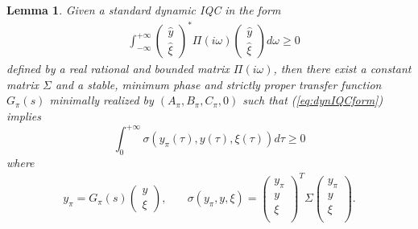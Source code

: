 \documentclass[letterpaper,10pt,conference,twocolumn]{IEEEtran}
\newtheorem{lem}[thm]{Lemma}
\newcommand{\csi}{\xi}
\newcommand{\w}{\omega}
\begin{document}
\begin{lem}\label{lem:from dynamic 2 static IQC}
	Given a standard dynamic IQC in the form
	\begin{align}\label{eq:dynIQCform}
		& \int_{-\infty}^{+\infty}
			\left(\begin{array}{c}
				\hat y\\
				\hat \csi
			\end{array}\right)^*
			\Pi(i\w)
			\left(\begin{array}{c}
				\hat y\\
				\hat \csi
			\end{array}\right)
		d\w \geq 0
	\end{align}
	defined by a real rational and bounded matrix $\Pi(i\w)$, then there exist a constant matrix $\Sigma$ and a stable, minimum phase and strictly proper transfer function $G_{\pi}(s)$ minimally realized by $(A_{\pi}, B_{\pi}, C_{\pi}, 0)$ such that (\ref{eq:dynIQCform}) implies
	\begin{equation*}
		\int_{0}^{+\infty}\sigma(y_{\pi}(\tau),y(\tau),\csi(\tau))d\tau \geq 0
	\end{equation*}
	where
	\begin{align*}
		y_{\pi}=G_{\pi}(s)\left(\begin{array}{c}
					y\\ \csi
				\end{array}\right),
		&\quad \sigma(y_{\pi},y,\csi)=
		\left(\begin{array}{c}
			y_{\pi}\\ y\\ \csi\\
		\end{array}\right)^T
		\Sigma
		\left(\begin{array}{c}
			y_{\pi}\\ y\\ \csi\\
		\end{array}\right).
	\end{align*}
\end{lem}
\end{document}
